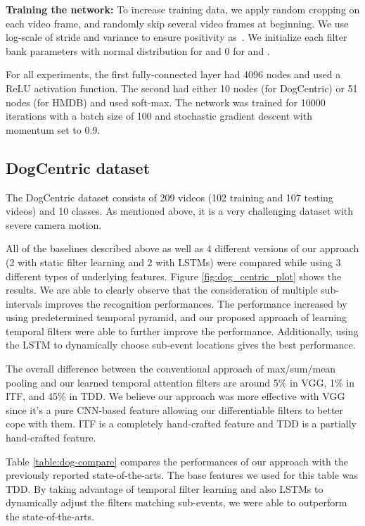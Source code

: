 \documentclass[letterpaper]{article}
\begin{document}
{\flushleft\textbf{Training the network:} To increase training data, we apply random cropping on each video frame, and randomly skip several video frames at beginning.  We use log-scale of stride and variance to ensure positivity as~\cite{attention15}.
We initialize each filter bank parameters  with normal distribution for   and 0 for  and .}

For all experiments, the first fully-connected layer had 4096 nodes and used a ReLU activation function. The second had either 10 nodes (for DogCentric) or 51 nodes (for HMDB) and used soft-max. The network was trained for 10000 iterations with a batch size of 100 and stochastic gradient descent with momentum set to 0.9. 

\subsection{DogCentric dataset}
The DogCentric dataset consists of 209 videos (102 training and 107 testing videos) and 10 classes. As mentioned above, it is a very challenging dataset with severe camera motion.

All of the baselines described above as well as 4 different versions of our approach (2 with static filter learning and 2 with LSTMs) were compared while using 3 different types of underlying features. Figure \ref{fig:dog_centric_plot} shows the results. We are able to clearly observe that the consideration of multiple sub-intervals improves the recognition performances. The performance increased by using predetermined temporal pyramid, and our proposed approach of learning temporal filters were able to further improve the performance. Additionally, using the LSTM to dynamically choose sub-event locations gives the best performance.

The overall difference between the conventional approach of max/sum/mean pooling and our learned temporal attention filters are around 5\% in VGG, 1\% in ITF, and 45\% in TDD. We believe our approach was more effective with VGG since it's a pure CNN-based feature allowing our differentiable filters to better cope with them. ITF is a completely hand-crafted feature and TDD is a partially hand-crafted feature.

Table \ref{table:dog-compare} compares the performances of our approach with the previously reported state-of-the-arts. The base features we used for this table was TDD. By taking advantage of temporal filter learning and also LSTMs to dynamically adjust the filters matching sub-events, we were able to outperform the state-of-the-arts.
\end{document}
